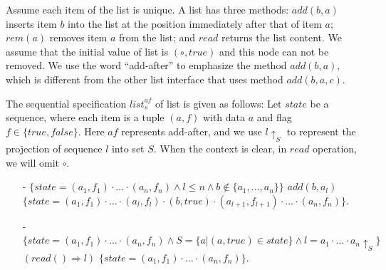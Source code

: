 \begin{example}
\label{definition:sequential specification of list with add-after interface}
Assume each item of the list is unique. A list has three methods: $\mathit{add}(b,a)$ inserts item $b$ into the list at the position immediately after that of item $a$; $\mathit{rem}(a)$ removes item $a$ from the list; and $\mathit{read}$ returns the list content. We assume that the initial value of list is $(\circ,\mathit{true})$ and this node can not be removed. We use the word ``add-after'' to emphasize the method $\mathit{add}(b,a)$, which is different from the other list interface that uses method $\mathit{add}(b,a,c)$.

The sequential specification $\mathit{list}_s^{\mathit{af}}$ of list is given as follows: Let $\mathit{state}$ be a sequence, where each item is a tuple $(a,f)$ with data $a$ and flag $f \in \{ \mathit{true},\mathit{false} \}$. Here $\mathit{af}$ represents add-after, and we use $l \uparrow_{S}$ to represent the projection of sequence $l$ into set $S$. When the context is clear, in $\mathit{read}$ operation, we will omit $\circ$.
\begin{itemize}
\setlength{\itemsep}{0.5pt}
\item[-] $\{ \mathit{state} = (a_1,f_1) \cdot \ldots \cdot (a_n,f_n) \wedge l \leq n \wedge b \notin \{ a_1, \ldots, a_n \} \}$ $add(b,a_l)$ $\{ \mathit{state} = (a_1,f_1) \cdot \ldots \cdot (a_l,f_l) \cdot (b,\mathit{true}) \cdot (a_{l+1},f_{l+1}) \cdot \ldots \cdot (a_n,f_n) \}$.
\item[-] $\{ \mathit{state} = (a_1,f_1) \cdot \ldots \cdot (a_n,f_n) \wedge S = \{ a \vert (a,\mathit{true}) \in \mathit{state} \} \wedge l = a_1 \cdot \ldots \cdot a_n \uparrow_{S} \}$ $(read() \Rightarrow l)$ $\{ \mathit{state} = (a_1,f_1) \cdot \ldots \cdot (a_n,f_n) \}$.
\end{itemize}
\end{example}




